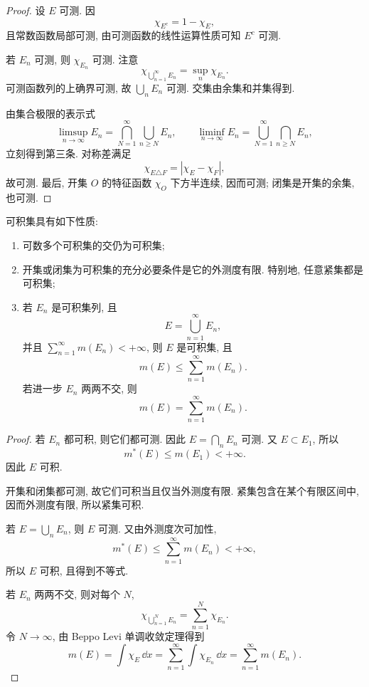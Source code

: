 \begin{proof}
	设 \(E\) 可测. 因
	\[
	\chi_{E^c}=1-\chi_E,
	\]
	且常数函数局部可测, 由可测函数的线性运算性质可知 \(E^c\) 可测.
	
	若 \(E_n\) 可测, 则 \(\chi_{E_n}\) 可测. 注意
	\[
	\chi_{\bigcup_{n=1}^{\infty}E_n}
	=
	\sup_n \chi_{E_n}.
	\]
	可测函数列的上确界可测, 故 \(\bigcup_nE_n\) 可测. 交集由余集和并集得到.
	
	由集合极限的表示式
	\[
	\limsup_{n\to\infty}E_n=\bigcap_{N=1}^{\infty}\bigcup_{n\geq N}E_n,
	\qquad
	\liminf_{n\to\infty}E_n=\bigcup_{N=1}^{\infty}\bigcap_{n\geq N}E_n,
	\]
	立刻得到第三条. 对称差满足
	\[
	\chi_{E\triangle F}=|\chi_E-\chi_F|,
	\]
	故可测. 最后, 开集 \(O\) 的特征函数 \(\chi_O\) 下方半连续, 因而可测; 闭集是开集的余集, 也可测.
\end{proof}

\begin{thm}\label{thm:integrable-set-basic-properties}
	可积集具有如下性质:
	\begin{enumerate}
		\item 可数多个可积集的交仍为可积集;
		\item 开集或闭集为可积集的充分必要条件是它的外测度有限. 特别地, 任意紧集都是可积集;
		\item 若 \(E_n\) 是可积集列, 且
		\[
		E=\bigcup_{n=1}^{\infty}E_n,
		\]
		并且 \(\sum_{n=1}^{\infty}m(E_n)<+\infty\), 则 \(E\) 是可积集, 且
		\[
		m(E)\leq \sum_{n=1}^{\infty}m(E_n).
		\]
		若进一步 \(E_n\) 两两不交, 则
		\begin{equation}
			m(E)=\sum_{n=1}^{\infty}m(E_n).
			\label{eq:countable-additivity-measure}
		\end{equation}
	\end{enumerate}
\end{thm}

\begin{proof}
	若 \(E_n\) 都可积, 则它们都可测. 因此 \(E=\bigcap_nE_n\) 可测. 又 \(E\subset E_1\), 所以
	\[
	m^*(E)\leq m(E_1)<+\infty.
	\]
	因此 \(E\) 可积.
	
	开集和闭集都可测, 故它们可积当且仅当外测度有限. 紧集包含在某个有限区间中, 因而外测度有限, 所以紧集可积.
	
	若 \(E=\bigcup_nE_n\), 则 \(E\) 可测. 又由外测度次可加性,
	\[
	m^*(E)\leq\sum_{n=1}^{\infty}m(E_n)<+\infty,
	\]
	所以 \(E\) 可积, 且得到不等式.
	
	若 \(E_n\) 两两不交, 则对每个 \(N\),
	\[
	\chi_{\bigcup_{n=1}^NE_n}=\sum_{n=1}^N\chi_{E_n}.
	\]
	令 \(N\to\infty\), 由 Beppo Levi 单调收敛定理得到
	\[
	m(E)=\int\chi_E\,\dd x
	=\sum_{n=1}^{\infty}\int\chi_{E_n}\,\dd x
	=\sum_{n=1}^{\infty}m(E_n).
	\]
\end{proof}

